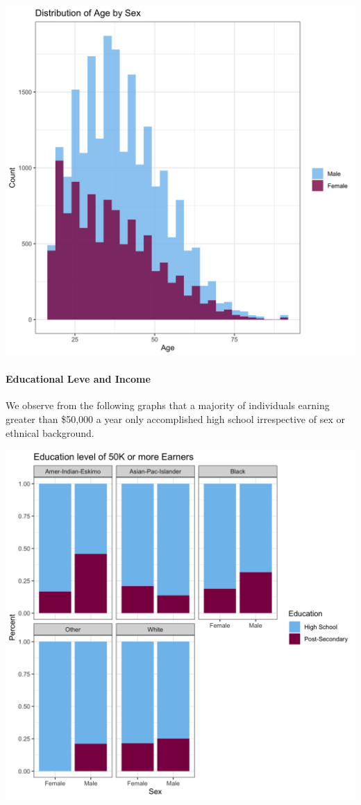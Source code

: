 \documentclass[]{article}
\let\oldparagraph\paragraph
\renewcommand{\paragraph}[1]{\oldparagraph{#1}\mbox{}}
\begin{document}
\includegraphics{../images/Plot_1_Distribution_of_Age_by_Sex.png}

\hypertarget{educational-leve-and-income}{%
\paragraph{Educational Leve and
Income}\label{educational-leve-and-income}}

We observe from the following graphs that a majority of individuals
earning greater than \$50,000 a year only accomplished high school
irrespective of sex or ethnical background.

\includegraphics{../images/Plot_2_Education_Level_of_50K_or_more_Earners.png}
\end{document}

